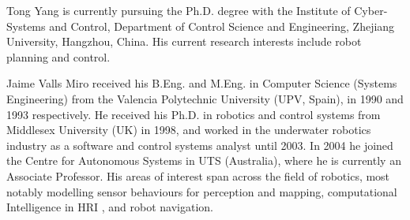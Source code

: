 \documentclass[journal]{IEEEtran}
\begin{document}
\begin{IEEEbiography}{Tong Yang} 
is currently pursuing the Ph.D. degree with the Institute of Cyber-Systems and Control, Department of Control Science and Engineering, Zhejiang University, Hangzhou, China. His current research interests include robot planning and control.
\end{IEEEbiography}

\begin{IEEEbiography}
{Jaime Valls Miro} received his B.Eng. and M.Eng. in Computer Science (Systems Engineering) from the Valencia Polytechnic University (UPV, Spain), in 1990 and 1993 respectively. He received his Ph.D. in robotics and control systems from Middlesex University (UK) in 1998, and worked in the underwater robotics industry as a software and control systems analyst until 2003. In 2004 he joined the Centre for Autonomous Systems in UTS (Australia), where he is currently an Associate Professor. His areas of interest span across the field of robotics, most notably modelling sensor behaviours for perception and mapping, computational Intelligence in HRI , and robot navigation. 
\end{IEEEbiography}

\end{document}
